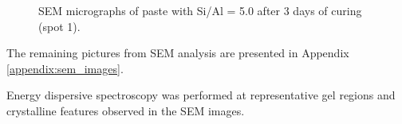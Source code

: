 \begin{figure}[H]
  \centering
  \caption{SEM micrographs of paste with Si/Al = 5.0 after 3 days of curing (spot 1).}
  \label{fig:si_al_5-0_spot1_sem}
\end{figure}

The remaining pictures from SEM analysis are presented in Appendix \ref{appendix:sem_images}.

Energy dispersive spectroscopy was performed at representative gel regions and crystalline features observed in the SEM images.

